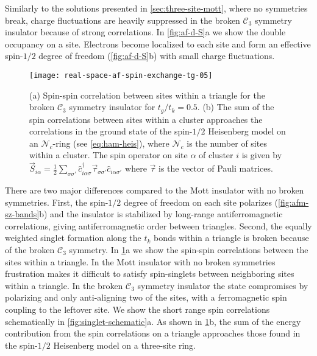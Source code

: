 \documentclass[reprint,aps,prb,amsmath,amssymb]{revtex4-2}
\begin{document}
Similarly to the solutions presented in \cref{sec:three-site-mott}, where no symmetries break, charge fluctuations are heavily suppressed in the broken $\mathcal{C}_3$ symmetry insulator because of strong correlations. In \cref{fig:af-d-S}a we show the double occupancy on a site. Electrons become localized to each site and form an effective spin-$1/2$ degree of freedom (\cref{fig:af-d-S}b) with small charge fluctuations.

\begin{figure}
	\centering
	\texttt{[image: real-space-af-spin-exchange-tg-05]}
	\caption
	{\label{fig:afm-correlations}
		(a) Spin-spin correlation between sites within a triangle for the broken $\mathcal{C}_3$ symmetry insulator for $t_g/t_k = 0.5$.
		(b) The sum of the spin correlations between sites within a cluster approaches the correlations in the ground state of the spin-$1/2$ Heisenberg model on an $\mathcal{N}_c$-ring (see \cref{eq:ham-heis}), where $\mathcal{N}_c$ is the number of sites within a cluster.
		The spin operator on site $\alpha$ of cluster $i$ is given by $\vec{S}_{i\alpha} = \frac{1}{2} \sum_{\sigma \sigma'} \hat{c}_{i\alpha\sigma}^{\dagger} \vec{\tau}_{\sigma \sigma'} \hat{c}_{i\alpha\sigma'}^{}$ where $\vec{\tau}$ is the vector of Pauli matrices.
	}
\end{figure}

There are two major differences compared to the Mott insulator with no broken symmetries. First, the spin-$1/2$ degree of freedom on each site polarizes (\cref{fig:afm-sz-bands}b) and the insulator is stabilized by long-range antiferromagnetic correlations, giving antiferromagnetic order between triangles. Second, the equally weighted singlet formation along the $t_k$ bonds within a triangle is broken because of the broken $\mathcal{C}_3$ symmetry. In \cref{fig:afm-correlations}a we show the spin-spin correlations between the sites within a triangle. In the Mott insulator with no broken symmetries frustration makes it difficult to satisfy spin-singlets between neighboring sites within a triangle. In the broken $\mathcal{C}_3$ symmetry insulator the state compromises by polarizing and only anti-aligning two of the sites, with a ferromagnetic spin coupling to the leftover site. We show the short range spin correlations schematically in \cref{fig:singlet-schematic}a. As shown in \cref{fig:afm-correlations}b, the sum of the energy contribution from the spin correlations on a triangle approaches those found in the spin-$1/2$ Heisenberg model on a three-site ring.
\end{document}
